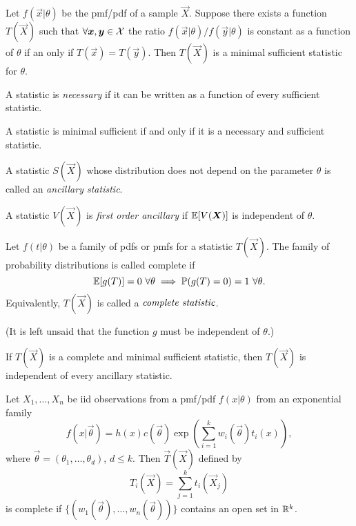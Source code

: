\begin{theorem}
    Let $f(\vec{x} \vert{} \theta)$ be the pmf/pdf of a sample $\vec{X}$. Suppose there exists a function $T(\vec{X})$ such that $\forall \bm{x}, \bm{y} \in \mathcal{X}{}$ the ratio $f(\vec{x}\vert{}\theta)/f(\vec{y}\vert{}\theta)$ is constant as a function of $\theta$ if an only if $T(\vec{x}) = T(\vec{y})$. Then $T(\vec{X})$ is a minimal sufficient statistic for $\theta$.
\end{theorem}

\begin{definition}
    A statistic is \emph{necessary} if it can be written as a function of every sufficient statistic.
\end{definition}

\begin{theorem}
    A statistic is minimal sufficient if and only if it is a necessary and sufficient statistic.
\end{theorem}

\begin{definition}
    A statistic $S(\vec{X})$ whose distribution does not depend on the parameter $\theta$ is called an \emph{ancillary statistic}.
\end{definition}

\begin{definition}
    A statistic $V(\vec{X})$ is \emph{first order ancillary}  if $\mathbb{E}{}[V(\bm{X})]$ is independent of $\theta$.
\end{definition}

\begin{definition}
    Let $f(t \vert{} \theta)$ be a family of pdfs or pmfs for a statistic $T(\vec{X})$. The family of probability distributions is called complete if
    \[
        \mathbb{E}{}[g(T)] = 0  \,\, \forall \theta \implies \mathbb{P}{}(g(T) = 0) = 1 \,\, \forall \theta.
        \]
    Equivalently, $T(\vec{X})$ is called a $\emph{complete statistic}$.
\end{definition}

(It is left unsaid that the function $g$ must be independent of $\theta$.)

\begin{theorem}
    If $T(\vec{X})$ is a complete and minimal sufficient statistic, then $T(\vec{X})$ is independent of every ancillary statistic.
\end{theorem}

\begin{theorem}
    Let $X_1, \dots, X_n$ be iid observations from a pmf/pdf $f(x \vert{} \theta)$ from an exponential family 
    \[
        f(x|\vec{\theta}) = h(x)c(\vec{\theta})\exp\left( \sum_{i=1}^k w_i(\vec{\theta}) t_i(x) \right),
    \]
    where $\vec{\theta} = (\theta_1, \dots, \theta_d)$, $d \leq k$. Then $\vec{T}(\vec{X})$ defined by
    \[
        T_i(\vec{X}) = \sum_{j=1}^k t_i(\vec{X}_j)
    \]
    is complete if $\{(w_1(\vec{\theta}), \dots, w_n(\vec{\theta}))\}$ contains an open set in $\mathbb{R}{}^k$.
\end{theorem}

